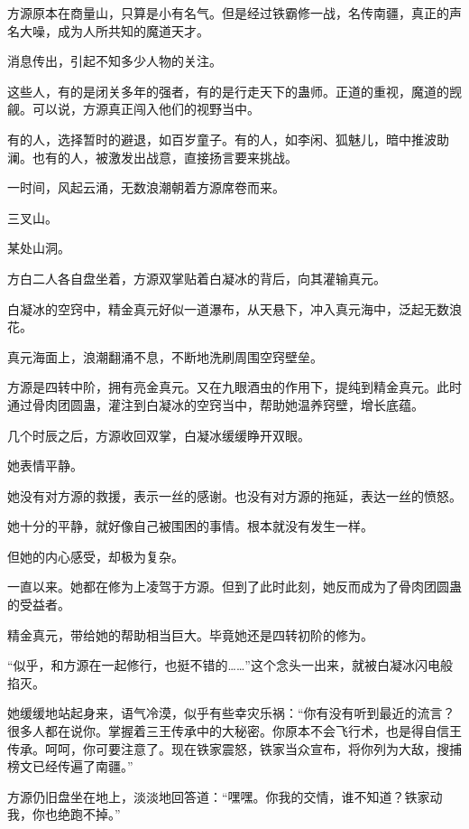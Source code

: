 
\begin{this_body}

方源原本在商量山，只算是小有名气。但是经过铁霸修一战，名传南疆，真正的声名大噪，成为人所共知的魔道天才。

消息传出，引起不知多少人物的关注。

这些人，有的是闭关多年的强者，有的是行走天下的蛊师。正道的重视，魔道的觊觎。可以说，方源真正闯入他们的视野当中。

有的人，选择暂时的避退，如百岁童子。有的人，如李闲、狐魅儿，暗中推波助澜。也有的人，被激发出战意，直接扬言要来挑战。

一时间，风起云涌，无数浪潮朝着方源席卷而来。

三叉山。

某处山洞。

方白二人各自盘坐着，方源双掌贴着白凝冰的背后，向其灌输真元。

白凝冰的空窍中，精金真元好似一道瀑布，从天悬下，冲入真元海中，泛起无数浪花。

真元海面上，浪潮翻涌不息，不断地洗刷周围空窍壁垒。

方源是四转中阶，拥有亮金真元。又在九眼酒虫的作用下，提纯到精金真元。此时通过骨肉团圆蛊，灌注到白凝冰的空窍当中，帮助她温养窍壁，增长底蕴。

几个时辰之后，方源收回双掌，白凝冰缓缓睁开双眼。

她表情平静。

她没有对方源的救援，表示一丝的感谢。也没有对方源的拖延，表达一丝的愤怒。

她十分的平静，就好像自己被围困的事情。根本就没有发生一样。

但她的内心感受，却极为复杂。

一直以来。她都在修为上凌驾于方源。但到了此时此刻，她反而成为了骨肉团圆蛊的受益者。

精金真元，带给她的帮助相当巨大。毕竟她还是四转初阶的修为。

“似乎，和方源在一起修行，也挺不错的……”这个念头一出来，就被白凝冰闪电般掐灭。

她缓缓地站起身来，语气冷漠，似乎有些幸灾乐祸：“你有没有听到最近的流言？很多人都在说你。掌握着三王传承中的大秘密。你原本不会飞行术，也是得自信王传承。呵呵，你可要注意了。现在铁家震怒，铁家当众宣布，将你列为大敌，搜捕榜文已经传遍了南疆。”

方源仍旧盘坐在地上，淡淡地回答道：“嘿嘿。你我的交情，谁不知道？铁家动我，你也绝跑不掉。”


\end{this_body}
